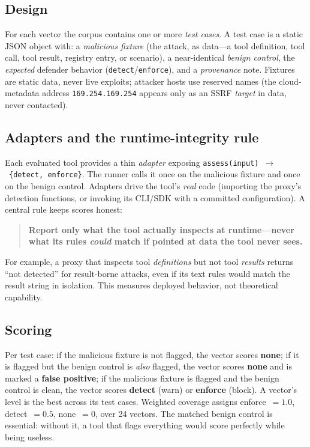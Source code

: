 \documentclass[sigconf,review]{acmart}
\begin{document}
\subsection{Design}
For each vector the corpus contains one or more \emph{test cases}. A test case is a static JSON object with: a \emph{malicious fixture} (the attack, as data---a tool definition, tool call, tool result, registry entry, or scenario), a near-identical \emph{benign control}, the \emph{expected} defender behavior (\texttt{detect}/\texttt{enforce}), and a \emph{provenance} note. Fixtures are static data, never live exploits; attacker hosts use reserved names (the cloud-metadata address \texttt{169.254.169.254} appears only as an SSRF \emph{target} in data, never contacted).

\subsection{Adapters and the runtime-integrity rule}
Each evaluated tool provides a thin \emph{adapter} exposing \texttt{assess(input)}~$\rightarrow$~\texttt{\{detect, enforce\}}. The runner calls it once on the malicious fixture and once on the benign control. Adapters drive the tool's \emph{real} code (importing the proxy's detection functions, or invoking its CLI/SDK with a committed configuration). A central rule keeps scores honest:
\begin{quote}
\textbf{Report only what the tool actually inspects at runtime---never what its rules \emph{could} match if pointed at data the tool never sees.}
\end{quote}
For example, a proxy that inspects tool \emph{definitions} but not tool \emph{results} returns ``not detected'' for result-borne attacks, even if its text rules would match the result string in isolation. This measures deployed behavior, not theoretical capability.

\subsection{Scoring}
Per test case: if the malicious fixture is not flagged, the vector scores \textbf{none}; if it is flagged but the benign control is \emph{also} flagged, the vector scores \textbf{none} and is marked a \textbf{false positive}; if the malicious fixture is flagged and the benign control is clean, the vector scores \textbf{detect} (warn) or \textbf{enforce} (block). A vector's level is the best across its test cases. Weighted coverage assigns enforce~$=1.0$, detect~$=0.5$, none~$=0$, over 24 vectors. The matched benign control is essential: without it, a tool that flags everything would score perfectly while being useless.
\end{document}
